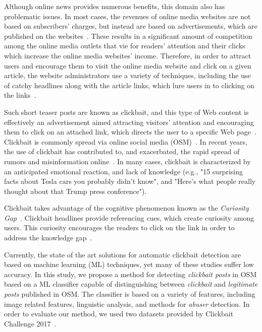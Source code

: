 \documentclass{sig-alternate}
\begin{document}
Although online news provides numerous benefits, this domain also has problematic issues.
In most cases, the revenues of online media websites are not based on subscribers' charges, but instead are based on advertisements, which are published on the websites~\cite{chakraborty2016stop}.  
These  results in a significant amount of competition among the online media outlets that vie for readers' attention and their clicks which increase the online media websites' income.
Therefore, in order to attract users and encourage them to visit the online media website and click on a given article, the website administrators use a variety of techniques, including the use of catchy headlines along with the article links, which lure users in to clicking on the links~\cite{chakraborty2016stop}.

Such short teaser posts are known as clickbait, and this type of Web content is effectively an advertisement aimed attracting visitors' attention and encouraging them to click on an attached link, which directs the user to a specific Web page~\cite{potthast2016clickbait}. 
Clickbait is commonly spread via online social media (OSM)~\cite{chen2015misleading}.
In recent years, the use of clickbait has contributed to, and exacerbated, the rapid spread of rumors and misinformation online~\cite{chen2015misleading}. 
In many cases, clickbait is characterized by an anticipated emotional reaction, and lack of knowledge (e.g., "15 surprising facts about Tesla cars you probably didn't know", and "Here's what people really thought about that Trump press conference").

Clickbait takes advantage of the cognitive phenomenon known as the \emph{Curiosity Gap}~\cite{loewenstein1994psychology}.
Clickbait headlines provide referencing cues, which create curiosity among users. 
This curiosity encourages the readers to click on the link in order to address the knowledge gap~\cite{chakraborty2016stop}.  

Currently, the state of the art solutions for automatic clickbait detection are based on machine learning (ML) techniques, yet many of these studies suffer low accuracy. 
In this study, we propose a method for detecting \emph{clickbait posts} in OSM based on a ML classifier capable of distinguishing between \emph{clickbait} and \emph{legitimate posts} published in OSM.   
The classifier is based on a variety of features, including image related features, linguistic analysis, and methods for \emph{abuser} detection. 
In order to evaluate our method, we used two datasets provided by Clickbait Challenge 2017~\cite{potthast:2017a}.   
\end{document}
